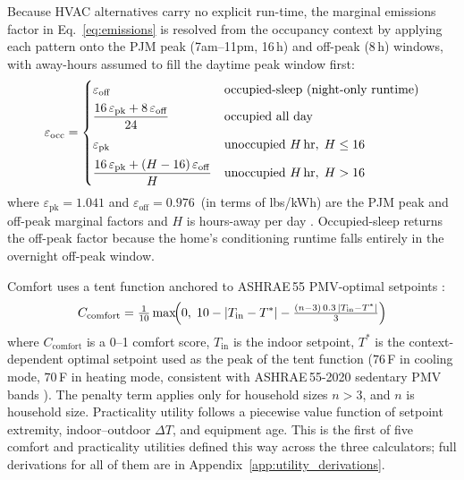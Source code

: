 \documentclass[final,3p,times]{elsarticle}
\begin{document}
Because HVAC alternatives carry no explicit run-time, the marginal emissions factor in Eq.~\ref{eq:emissions} is resolved from the occupancy context by applying each pattern onto the PJM peak (7am--11pm, 16\,h) and off-peak (8\,h) windows, with away-hours assumed to fill the daytime peak window first:
\begin{equation}
  \varepsilon_{\mathrm{occ}} =
  \begin{cases}
    \varepsilon_{\mathrm{off}} & \text{occupied-sleep (night-only runtime)} \\[4pt]
    \dfrac{16\,\varepsilon_{\mathrm{pk}} + 8\,\varepsilon_{\mathrm{off}}}{24}
      & \text{occupied all day} \\[8pt]
    \varepsilon_{\mathrm{pk}} & \text{unoccupied } H\text{\,hr},\; H \le 16 \\[4pt]
    \dfrac{16\,\varepsilon_{\mathrm{pk}} + (H-16)\,\varepsilon_{\mathrm{off}}}{H}
      & \text{unoccupied } H\text{\,hr},\; H > 16
  \end{cases}
  \label{eq:hvac_occ_emissions}
\end{equation}
\noindent where $\varepsilon_{\mathrm{pk}} = 1.041$ and $\varepsilon_{\mathrm{off}} = 0.976$\ (in terms of lbs/kWh) are the PJM peak and off-peak marginal factors and $H$ is hours-away per day \cite{pjm2022emissions}. Occupied-sleep returns the off-peak factor because the home's conditioning runtime falls entirely in the overnight off-peak window.

Comfort uses a tent function anchored to ASHRAE\,55 PMV-optimal setpoints \cite{ashrae55_2020,vanhoof2008,fanger1970}:
\begin{equation}
  C_{\mathrm{comfort}} = \tfrac{1}{10}\max\!\Bigl(0,\; 10 - \lvert T_{\mathrm{in}} - T^{*}\rvert - \tfrac{(n-3)\,0.3\,\lvert T_{\mathrm{in}} - T^{*}\rvert}{3}\Bigr)
  \label{eq:hvac_comfort}
\end{equation}
\noindent where $C_{\mathrm{comfort}}$ is a 0--1 comfort score, $T_{\mathrm{in}}$ is the indoor setpoint, $T^{*}$ is the context-dependent optimal setpoint used as the peak of the tent function ($76$\,\textdegree{}F in cooling mode, $70$\,\textdegree{}F in heating mode, consistent with ASHRAE\,55-2020 sedentary PMV bands \cite{ashrae55_2020}). The penalty term applies only for household sizes $n > 3$, and $n$ is household size.
Practicality utility follows a piecewise value function of setpoint extremity, indoor--outdoor $\Delta T$, and equipment age. This is the first of five comfort and practicality utilities defined this way across the three calculators; full derivations for all of them are in Appendix~\ref{app:utility_derivations}.
\end{document}
